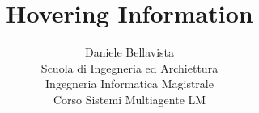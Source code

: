 \documentclass[11pt]{article}
\begin{document}
\title{Hovering Information}
\author{Daniele Bellavista\\
Scuola di Ingegneria ed Archiettura\\
Ingegneria Informatica Magistrale\\
Corso Sistemi Multiagente LM\\
}

\maketitle





\nocite{*}
{}
\end{document}
